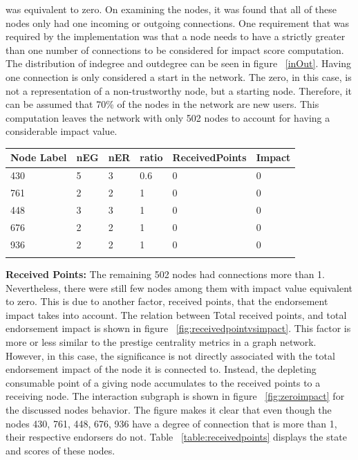 was equivalent to zero. On examining the nodes, it was found that all of these
nodes only had one incoming or outgoing connections. One requirement that was
required by the implementation was that a node needs to have a strictly greater
than one number of connections to be considered for impact score computation.
The distribution of indegree and outdegree can be seen in figure ~\ref{inOut}.
Having one connection is only considered a start in the network. The zero, in
this case, is not a representation of a non-trustworthy node, but a starting
node. Therefore, it can be assumed that 70\% of the nodes in the network are
new users. This computation leaves the network with only 502 nodes to account
for having a considerable impact value. 

\begin{tabularx}{\textwidth}{| X | X | X | X | X| X| }
  \hline
   \textbf{Node Label} & \textbf{nEG} & \textbf{nER} & \textbf{ratio} & \textbf{ReceivedPoints} & \textbf{Impact} \\
  \hline 
  430  & 5  & 3  & 0.6 & 0 & 0 \\
  \hline
   761 & 2  & 2  & 1 & 0 & 0 \\
  \hline
  448  & 3  & 3  & 1 & 0 & 0 \\
  \hline
  676  & 2  & 2  & 1 & 0 & 0 \\
  \hline
  936  & 2  & 2  & 1 & 0 & 0 \\
  \hline
  \caption{Nodes with Impact zero because of the receivedpoints}
  \label{table:receivedpoints}
\end{tabularx}

\textbf{Received Points:}
The remaining 502 nodes had connections more than 1. Nevertheless, there were
still few nodes among them with impact value equivalent to zero. This is due to
another factor, received points, that the endorsement impact takes into
account. The relation between Total received points, and total endorsement
impact is shown in figure ~\ref{fig:receivedpointvsimpact}. This factor is more
or less similar to the prestige centrality metrics in a graph network. However,
in this case, the significance is not directly associated with the total
endorsement impact of the node it is connected to. Instead, the depleting
consumable point of a giving node accumulates to the received points to a
receiving node.  The interaction subgraph is shown in figure
~\ref{fig:zeroimpact} for the discussed nodes behavior. The figure makes it
clear that even though the nodes 430, 761, 448, 676, 936 have a degree of
connection that is more than 1, their respective endorsers do not. Table
~\ref{table:receivedpoints} displays the state and scores of these nodes. 

